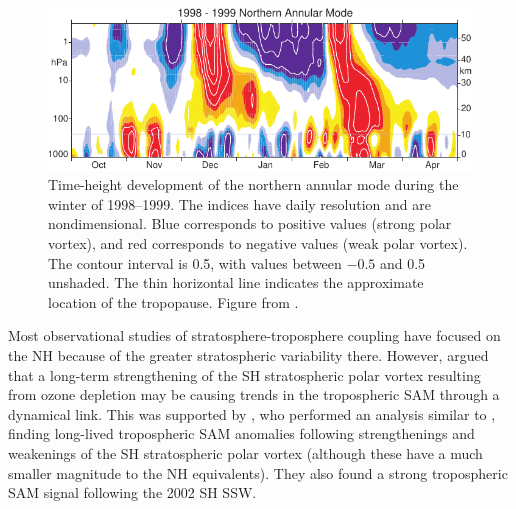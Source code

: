 \begin{figure}
 \centering
 \noindent\includegraphics[width=\textwidth]{figures/chapter-intro/Baldwin_Dunkerton_98-99.pdf}
 \caption[NAM time series from \citet{Baldwin2001a}]{Time-height development of
   the northern annular mode during the winter of 1998--1999. The indices have
   daily resolution and are nondimensional. Blue corresponds to positive values
   (strong polar vortex), and red corresponds to negative values (weak polar
   vortex). The contour interval is 0.5, with values between $-0.5$ and 0.5
   unshaded. The thin horizontal line indicates the approximate location of the
   tropopause. Figure from \citet{Baldwin2001a}.}
 \label{fig:baldwin_dunkerton}
\end{figure}

Most observational studies of stratosphere-troposphere coupling have focused on
the NH because of the greater stratospheric variability there. However,
\citet{Thompson2002a} argued that a long-term strengthening of the SH
stratospheric polar vortex resulting from ozone depletion may be causing trends
in the tropospheric SAM through a dynamical link. This was supported by
\citet{Thompson2005}, who performed an analysis similar to \citet{Baldwin2001a},
finding long-lived tropospheric SAM anomalies following strengthenings and
weakenings of the SH stratospheric polar vortex (although these have a much
smaller magnitude to the NH equivalents). They also found a strong tropospheric
SAM signal following the 2002 SH SSW.

